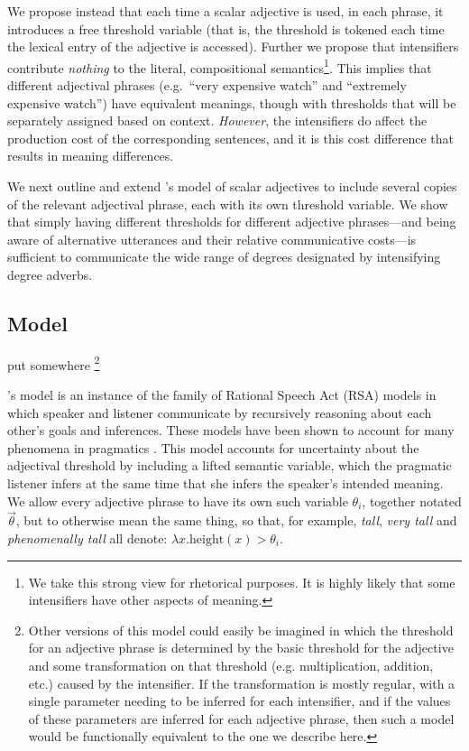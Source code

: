 \documentclass[10pt,letterpaper]{article}
\newcommand{\w}[1]{\emph{#1}}
\newcommand{\todo}[1]{{\color{red}#1}}
\begin{document}
We propose instead that each time a scalar adjective is used, in each phrase, it introduces a free threshold variable (that is, the threshold is tokened each time the lexical entry of the adjective is accessed). Further we propose that intensifiers contribute \emph{nothing} to the literal, compositional semantics\footnote{We take this strong view for rhetorical purposes. It is highly likely that some intensifiers have other aspects of meaning.}. This implies that different adjectival phrases (e.g.~``very expensive watch'' and ``extremely expensive watch'') have equivalent meanings, though with thresholds that will be separately assigned based on context. \emph{However}, the intensifiers do affect the production cost of the corresponding sentences, and it is this cost difference that results in meaning differences.


We next outline and extend 's model of scalar adjectives to include several copies of the relevant adjectival phrase, each with its own threshold variable.
We show that simply having different thresholds for different adjective phrases---and being aware of alternative utterances and their relative communicative costs---is sufficient to communicate the wide range of degrees designated by intensifying degree adverbs.

\subsection{Model}

\todo{put somewhere \footnote{Other versions of this model could easily be imagined in which the threshold for an adjective phrase is determined by the basic threshold for the adjective and some transformation on that threshold (e.g. multiplication, addition, etc.) caused by the intensifier. If the transformation is mostly regular, with a single parameter needing to be inferred for each intensifier, and if the values of these parameters are inferred for each adjective phrase, then such a model would be functionally equivalent to the one we describe here.}}

's model is an instance of the family of Rational Speech Act (RSA) models in which speaker and listener communicate by recursively reasoning about each other's goals and inferences. These models have been shown to account for many phenomena in pragmatics \cite{rsa}. This model accounts for uncertainty about the adjectival threshold by including a lifted semantic variable, which the pragmatic listener infers at the same time that she infers the speaker's intended meaning. 
We allow every adjective phrase to have its own such variable $\theta_i$, together notated $\vec{\theta}$, but to otherwise mean the same thing, so that, for example, \w{tall}, \w{very tall} and \w{phenomenally tall} all denote: $\lambda x . \text{height}(x) > \theta_i$.
\end{document}
